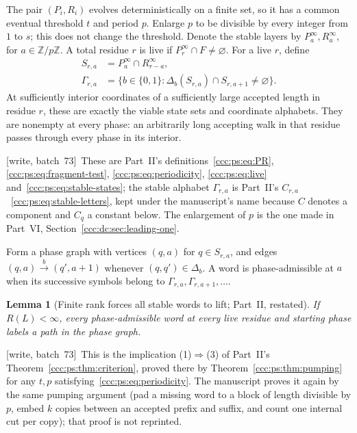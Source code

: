 \documentclass[11pt,letterpaper]{article}
\newtheorem{lemma}[theorem]{Lemma}
\theoremstyle{definition}
\theoremstyle{remark}
\newcommand{\wsevthree}{\textup{[write, batch~73]}}
\begin{document}
The pair $(P_i,R_i)$ evolves deterministically on a finite set, so it has a common eventual threshold $t$ and period $p$. Enlarge $p$ to be divisible by every integer from $1$ to $s$; this does not change the threshold. Denote the stable layers by $P_a^\infty,R_a^\infty$, for $a\in\mathbb Z/p\mathbb Z$. A total residue $r$ is live if $P_r^\infty\cap F\ne\varnothing$. For a live $r$, define
\begin{align*}
 S_{r,a}&=P_a^\infty\cap R_{r-a}^\infty,\\
 \Gamma_{r,a}&=\{b\in\{0,1\}:\Delta_b(S_{r,a})\cap S_{r,a+1}\ne\varnothing\}.
\end{align*}
At sufficiently interior coordinates of a sufficiently large accepted length in residue $r$, these are exactly the viable state sets and coordinate alphabets. They are nonempty at every phase: an arbitrarily long accepting walk in that residue passes through every phase in its interior.

\wsevthree\ These are Part~II's definitions~\eqref{ccc:ps:eq:PR},
\eqref{ccc:ps:eq:fragment-test}, \eqref{ccc:ps:eq:periodicity},
\eqref{ccc:ps:eq:live} and~\eqref{ccc:ps:eq:stable-states}; the stable
alphabet $\Gamma_{r,a}$ is Part~II's $C_{r,a}$~\eqref{ccc:ps:eq:stable-letters},
kept under the manuscript's name because $C$ denotes a component and $C_q$ a
constant below. The enlargement of $p$ is the one made in Part~VI,
Section~\ref{ccc:dc:sec:leading-one}.

Form a phase graph with vertices $(q,a)$ for $q\in S_{r,a}$, and edges $(q,a)\xrightarrow{b}(q',a+1)$ whenever $(q,q')\in\Delta_b$. A word is phase-admissible at $a$ when its successive symbols belong to $\Gamma_{r,a},\Gamma_{r,a+1},\ldots$.

\begin{lemma}[Finite rank forces all stable words to lift; Part~II, restated]\label{ccc:sc:lem:interior}
If $R(L)<\infty$, every phase-admissible word at every live residue and starting phase labels a path in the phase graph.
\end{lemma}
\noindent\wsevthree\ This is the implication (1)$\Rightarrow$(3) of Part~II's
Theorem~\ref{ccc:ps:thm:criterion}, proved there by
Theorem~\ref{ccc:ps:thm:pumping} for any $t,p$
satisfying~\eqref{ccc:ps:eq:periodicity}. The manuscript proves it again by
the same pumping argument (pad a missing word to a block of length divisible
by $p$, embed $k$ copies between an accepted prefix and suffix, and count one
internal cut per copy); that proof is not reprinted.
\end{document}
